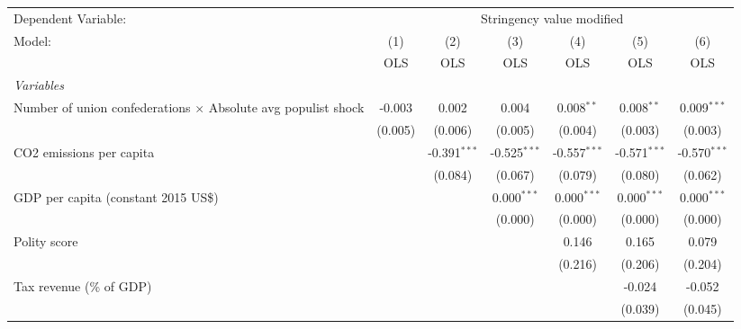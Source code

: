 
\begingroup
\centering
\begin{tabular}{lcccccc}
   \toprule
   Dependent Variable: & \multicolumn{6}{c}{Stringency value modified}\\
   Model:                                                               & (1)     & (2)            & (3)            & (4)            & (5)            & (6)\\  
                                                                        &  OLS    & OLS            & OLS            & OLS            & OLS            & OLS\\  
   \midrule
   \emph{Variables}\\
   Number of union confederations $\times$ Absolute avg populist shock  & -0.003  & 0.002          & 0.004          & 0.008$^{**}$   & 0.008$^{**}$   & 0.009$^{***}$\\   
                                                                        & (0.005) & (0.006)        & (0.005)        & (0.004)        & (0.003)        & (0.003)\\   
   CO2 emissions per capita                                             &         & -0.391$^{***}$ & -0.525$^{***}$ & -0.557$^{***}$ & -0.571$^{***}$ & -0.570$^{***}$\\   
                                                                        &         & (0.084)        & (0.067)        & (0.079)        & (0.080)        & (0.062)\\   
   GDP per capita (constant 2015 US\$)                                  &         &                & 0.000$^{***}$  & 0.000$^{***}$  & 0.000$^{***}$  & 0.000$^{***}$\\   
                                                                        &         &                & (0.000)        & (0.000)        & (0.000)        & (0.000)\\   
   Polity score                                                         &         &                &                & 0.146          & 0.165          & 0.079\\   
                                                                        &         &                &                & (0.216)        & (0.206)        & (0.204)\\   
   Tax revenue (\% of GDP)                                              &         &                &                &                & -0.024         & -0.052\\   
                                                                        &         &                &                &                & (0.039)        & (0.045)\\   

\end{tabular}
